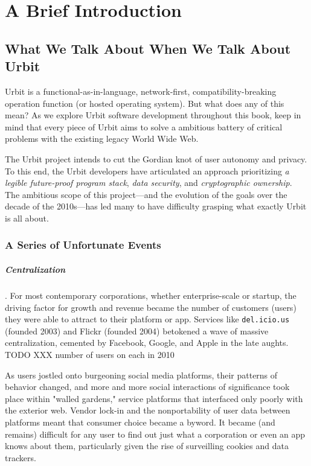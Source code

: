 \setchapterpreamble[u]{\margintoc}
\chapter{A Brief Introduction}


\section{What We Talk About When We Talk About Urbit}

Urbit is a functional-as-in-language, network-first, compatibility-breaking
operation function (or hosted operating system).  But what does any of this mean?  As we explore Urbit software development throughout this book, keep in mind that every piece of Urbit aims to solve a ambitious battery of critical problems with the existing legacy World Wide Web.

The Urbit project intends to cut the Gordian knot of user autonomy and privacy.  To this end, the Urbit developers have articulated an approach prioritizing \emph{a legible future-proof program stack}, \emph{data security}, and \emph{cryptographic ownership}.  The ambitious scope of this project—and the evolution of the goals over the decade of the 2010s—has led many to have difficulty grasping what exactly Urbit is all about.

\subsection{A Series of Unfortunate Events}

\paragraph{Centralization}.  For most contemporary corporations, whether enterprise-scale or startup, the driving factor for growth and revenue became the number of customers (users) they were able to attract to their platform or app.  Services like \texttt{del.icio.us} (founded 2003) and Flickr (founded 2004) betokened a wave of massive centralization, cemented by Facebook, Google, and Apple in the late aughts.  TODO XXX number of users on each in 2010

As users jostled onto burgeoning social media platforms, their patterns of behavior changed, and more and more social interactions of significance took place within "walled gardens," service platforms that interfaced only poorly with the exterior web.  Vendor lock-in and the nonportability of user data between platforms meant that consumer choice became a byword.  It became (and remains) difficult for any user to find out just what a corporation or even an app knows about them, particularly given the rise of surveilling cookies and data trackers.

